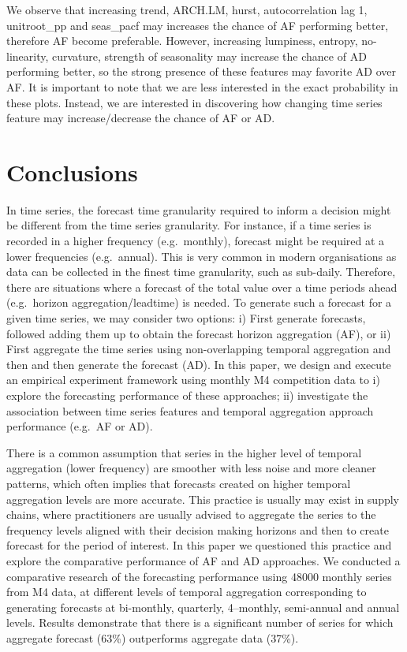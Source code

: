 \documentclass[]{elsarticle} %
\begin{document}
We observe that increasing trend, ARCH.LM, hurst, autocorrelation lag 1,
unitroot\_pp and seas\_pacf may increases the chance of AF performing
better, therefore AF become preferable. However, increasing lumpiness,
entropy, no-linearity, curvature, strength of seasonality may increase
the chance of AD performing better, so the strong presence of these
features may favorite AD over AF. It is important to note that we are
less interested in the exact probability in these plots. Instead, we are
interested in discovering how changing time series feature may
increase/decrease the chance of AF or AD.

\hypertarget{con}{%
\section{Conclusions}\label{con}}

In time series, the forecast time granularity required to inform a
decision might be different from the time series granularity. For
instance, if a time series is recorded in a higher frequency
(e.g.~monthly), forecast might be required at a lower frequencies
(e.g.~annual). This is very common in modern organisations as data can
be collected in the finest time granularity, such as sub-daily.
Therefore, there are situations where a forecast of the total value over
a time periods ahead (e.g.~horizon aggregation/leadtime) is needed. To
generate such a forecast for a given time series, we may consider two
options: i) First generate forecasts, followed adding them up to obtain
the forecast horizon aggregation (AF), or ii) First aggregate the time
series using non-overlapping temporal aggregation and then and then
generate the forecast (AD). In this paper, we design and execute an
empirical experiment framework using monthly M4 competition data to i)
explore the forecasting performance of these approaches; ii) investigate
the association between time series features and temporal aggregation
approach performance (e.g.~AF or AD).

There is a common assumption that series in the higher level of temporal
aggregation (lower frequency) are smoother with less noise and more
cleaner patterns, which often implies that forecasts created on higher
temporal aggregation levels are more accurate. This practice is usually
may exist in supply chains, where practitioners are usually advised to
aggregate the series to the frequency levels aligned with their decision
making horizons and then to create forecast for the period of interest.
In this paper we questioned this practice and explore the comparative
performance of AF and AD approaches. We conducted a comparative research
of the forecasting performance using 48000 monthly series from M4 data,
at different levels of temporal aggregation corresponding to generating
forecasts at bi-monthly, quarterly, 4--monthly, semi-annual and annual
levels. Results demonstrate that there is a significant number of series
for which aggregate forecast (63\%) outperforms aggregate data (37\%).
\end{document}
